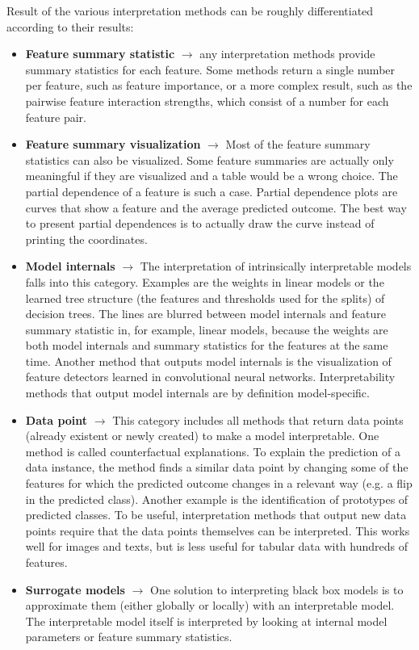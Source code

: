 Result of the various interpretation methods can be roughly differentiated according to their results:
\begin{itemize}
    \item \textbf{Feature summary statistic} $\rightarrow$ any interpretation methods provide summary 
    statistics for each feature. Some methods return a single number per feature, such as feature importance, 
    or a more complex result, such as the pairwise feature interaction strengths, which consist of a number 
    for each feature pair. 

    \item \textbf{Feature summary visualization} $\rightarrow$ Most of the feature summary statistics can also be visualized. 
    Some feature summaries are actually only meaningful if they are visualized and a table would be a wrong choice. 
    The partial dependence of a feature is such a case. 
    Partial dependence plots are curves that show a feature and the average predicted outcome. 
    The best way to present partial dependences is to actually draw the curve instead of printing the coordinates.

    \item \textbf{Model internals} $\rightarrow$ The interpretation of intrinsically interpretable models falls into this category. 
    Examples are the weights in linear models or the learned tree structure (the features and thresholds used for the splits) 
    of decision trees. The lines are blurred between model internals and feature summary statistic in, for example, linear models, 
    because the weights are both model internals and summary statistics for the features at the same time. Another method that 
    outputs model internals is the visualization of feature detectors learned in convolutional neural networks. Interpretability 
    methods that output model internals are by definition model-specific.

    \item \textbf{Data point} $\rightarrow$  This category includes all methods that return data points (already existent or newly created) 
    to make a model interpretable. One method is called counterfactual explanations. To explain the prediction of a data instance, the method 
    finds a similar data point by changing some of the features for which the predicted outcome changes in a relevant way (e.g. a flip in the 
    predicted class). Another example is the identification of prototypes of predicted classes. To be useful, interpretation methods that output 
    new data points require that the data points themselves can be interpreted. This works well for images and texts, but is less useful for tabular 
    data with hundreds of features.

    \item \textbf{Surrogate models} $\rightarrow$ One solution to interpreting black box models is to approximate them (either globally or locally) with an interpretable model. 
    The interpretable model itself is interpreted by looking at internal model parameters or feature summary statistics.
\end{itemize}

